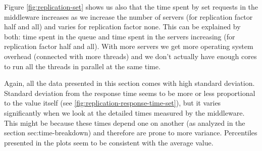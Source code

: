 \documentclass[11pt]{article}
\begin{document}
Figure \ref{fig:replication-set} shows us also that the time spent by set requests in the middleware increases as we increase the number of servers (for replication factor half and all) and varies for replication factor none. This can be explained by both: time spent in the queue and time spent in the servers increasing (for replication factor half and all). With more servers we get more operating system overhead (connected with more threads) and we don't actually have enough cores to run all the threads in parallel at the same time. 

Again, all the data presented in this section comes with high standard deviation. Standard deviation from the response time seems to be more or less proportional to the value itself (see \ref{fig:replication-response-time-set}), but it varies significantly when we look at the detailed times measured by the middleware. This might be because these times depend one on another (as analyzed in the section {sec:time-breakdown}) and therefore are prone to more variance. Percentiles presented in the plots seem to be consistent with the average value.
\end{document}
